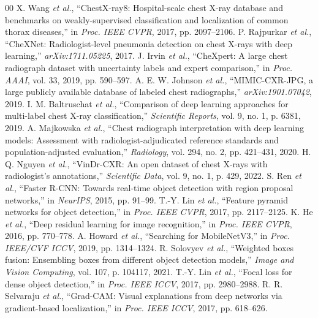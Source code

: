 \documentclass[conference]{IEEEtran}
\begin{document}
\begin{thebibliography}{00}
\footnotesize
{} X. Wang \textit{et al.}, ``ChestX-ray8: Hospital-scale chest X-ray database and benchmarks on weakly-supervised classification and localization of common thorax diseases,'' in \textit{Proc. IEEE CVPR}, 2017, pp. 2097--2106.
 P. Rajpurkar \textit{et al.}, ``CheXNet: Radiologist-level pneumonia detection on chest X-rays with deep learning,'' \textit{arXiv:1711.05225}, 2017.
 J. Irvin \textit{et al.}, ``CheXpert: A large chest radiograph dataset with uncertainty labels and expert comparison,'' in \textit{Proc. AAAI}, vol. 33, 2019, pp. 590--597.
 A. E. W. Johnson \textit{et al.}, ``MIMIC-CXR-JPG, a large publicly available database of labeled chest radiographs,'' \textit{arXiv:1901.07042}, 2019.
 I. M. Baltruschat \textit{et al.}, ``Comparison of deep learning approaches for multi-label chest X-ray classification,'' \textit{Scientific Reports}, vol. 9, no. 1, p. 6381, 2019.
 A. Majkowska \textit{et al.}, ``Chest radiograph interpretation with deep learning models: Assessment with radiologist-adjudicated reference standards and population-adjusted evaluation,'' \textit{Radiology}, vol. 294, no. 2, pp. 421--431, 2020.
 H. Q. Nguyen \textit{et al.}, ``VinDr-CXR: An open dataset of chest X-rays with radiologist's annotations,'' \textit{Scientific Data}, vol. 9, no. 1, p. 429, 2022.
 S. Ren \textit{et al.}, ``Faster R-CNN: Towards real-time object detection with region proposal networks,'' in \textit{NeurIPS}, 2015, pp. 91--99.
 T.-Y. Lin \textit{et al.}, ``Feature pyramid networks for object detection,'' in \textit{Proc. IEEE CVPR}, 2017, pp. 2117--2125.
 K. He \textit{et al.}, ``Deep residual learning for image recognition,'' in \textit{Proc. IEEE CVPR}, 2016, pp. 770--778.
 A. Howard \textit{et al.}, ``Searching for MobileNetV3,'' in \textit{Proc. IEEE/CVF ICCV}, 2019, pp. 1314--1324.
 R. Solovyev \textit{et al.}, ``Weighted boxes fusion: Ensembling boxes from different object detection models,'' \textit{Image and Vision Computing}, vol. 107, p. 104117, 2021.
 T.-Y. Lin \textit{et al.}, ``Focal loss for dense object detection,'' in \textit{Proc. IEEE ICCV}, 2017, pp. 2980--2988.
 R. R. Selvaraju \textit{et al.}, ``Grad-CAM: Visual explanations from deep networks via gradient-based localization,'' in \textit{Proc. IEEE ICCV}, 2017, pp. 618--626.

\end{thebibliography}
\end{document}
